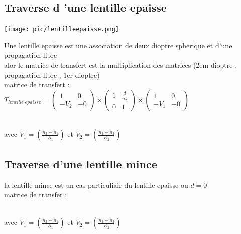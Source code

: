 \documentclass[12pt]{book}
\begin{document}
        \subsection{Traverse d 'une lentille epaisse}
            \begin{center}
                \texttt{[image: pic/lentilleepaisse.png]}
            \end{center}
            Une lentille epaisse est une association de deux dioptre spherique et d'une propagation libre  \\
            alor le matrice de transfert est la  multiplication des matrices (2em dioptre , propagation libre , 1er dioptre)
            \\
            matrice de transfert : 
            $
            T_{lentille \; epaisse}= 
            \begin{pmatrix}
                1 & 0 \\
                -V_2& -0
            \end{pmatrix} \times
            \begin{pmatrix}
                1 & \frac{d}{n_2}\\
                0 & 1
            \end{pmatrix} \times
            \begin{pmatrix}
                1 & 0 \\
                -V_1& -0
            \end{pmatrix}
            $          
            \begin{center}
                 \\ avec $V_1 = (\frac{n_2 - n_1}{R_1})$ et $V_2 = (\frac{n_3 - n_2}{R_2})$
            \end{center} 
        \subsection{Traverse d'une lentille mince}
            la lentille mince est un cas particuliair du lentille epaisse ou $d=0$
            \\ matrice de transfer :
            \begin{center}
                 \\ avec $V_1 = (\frac{n_2 - n_1}{R_1})$ et $V_2 = (\frac{n_3 - n_2}{R_2})$
            \end{center} 
\end{document}
